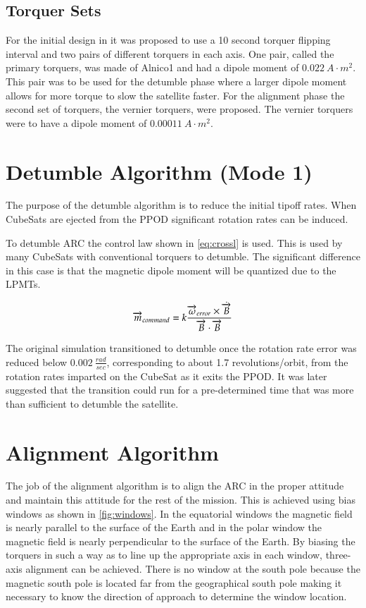 \subsection{Torquer Sets}

For the initial design in \cite{Mentch11} it was proposed to use a 10 second torquer flipping interval and two pairs of different torquers in each axis. One pair, called the primary torquers, was made of Alnico1 and had a dipole moment of $0.022~\unit{A}{\cdot}\unit{m^2}$. This pair was to be used for the detumble phase where a larger dipole moment allows for more torque to slow the satellite faster. For the alignment phase the second set of torquers, the vernier torquers, were proposed. The vernier torquers were to have a dipole moment of $0.00011~\unit{A}{\cdot}\unit{m^2}$.

\section{Detumble Algorithm (Mode 1)}

The purpose of the detumble algorithm is to reduce the initial tipoff rates. When CubeSats are ejected from the \ac{PPOD} significant rotation rates can be induced.

To detumble \ac{ARC} the control law shown in \cref{eq:crossl} is used. This is used by many CubeSats with conventional torquers to detumble. The significant difference in this case is that the magnetic dipole moment will be quantized due to the \acp{LPMT}.

\begin{equation}
    \overrightarrow{m}_{command} = k {\frac{\overrightarrow{\omega}_{error} \times \dot{\overrightarrow{B}}}{\overrightarrow{B} \cdot \overrightarrow{B}}}
    \label{eq:crossl}
\end{equation}

The original simulation transitioned to detumble once the rotation rate error was reduced below $0.002~\unit{\frac{rad}{sec}}$, corresponding to about 1.7 revolutions/orbit, from the rotation rates imparted on the CubeSat as it exits the \ac{PPOD}. It was later suggested that the transition could run for a pre-determined time that was more than sufficient to detumble the satellite.

\section{Alignment Algorithm}

The job of the alignment algorithm is to align the \ac{ARC} in the proper attitude and maintain this attitude for the rest of the mission. This is achieved using bias windows as shown in \cref{fig:windows}. In the equatorial windows the magnetic field is nearly parallel to the surface of the Earth and in the polar window the magnetic field is nearly perpendicular to the surface of the Earth. By biasing the torquers in such a way as to line up the appropriate axis in each window, three-axis alignment can be achieved. There is no window at the south pole because the magnetic south pole is located far from the geographical south pole making it necessary to know the direction of approach to determine the window location.

